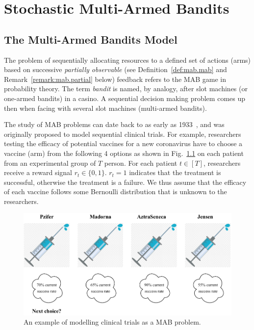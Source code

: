 \chapter{Stochastic Multi-Armed Bandits}\label{chap:mab}
	\minitoc
	\newpage


\section{The Multi-Armed Bandits Model}\label{sec:mab.model}

The problem of sequentially allocating resources to a defined set of actions (arms) based on successive \emph{partially observable} (see Definition~\ref{def:mab.mab} and Remark~\ref{remark:mab.partial} below) feedback refers to the MAB game in probability theory. The term \emph{bandit} is named, by analogy, after slot machines (or one-armed bandits) in a casino. A sequential decision making problem comes up then when facing with several slot machines (multi-armed bandits).

The study of MAB problems can date back to as early as 1933~\citep{thompson1933}, and was originally proposed to model sequential clinical trials. For example, researchers testing the efficacy of potential vaccines for a new coronavirus have to choose a vaccine (arm) from the following 4 options as shown in Fig.~\ref{fig:mab.covid} on each patient from an experimental group of $T$ person. For each patient $t\in[T]$, researchers receive a reward signal $r_t\in\{0,1\}$. $r_t=1$ indicates that the treatment is successful, otherwise the treatment is a failure. We thus assume that the efficacy of each vaccine follows some Bernoulli distribution that is unknown to the researchers.

\begin{figure}[ht]
    \centering
    \includegraphics[width=\textwidth]{Chapter2/img/covid.pdf}
    \caption{An example of modelling clinical trials as a MAB problem.}
    \label{fig:mab.covid}
\end{figure}

